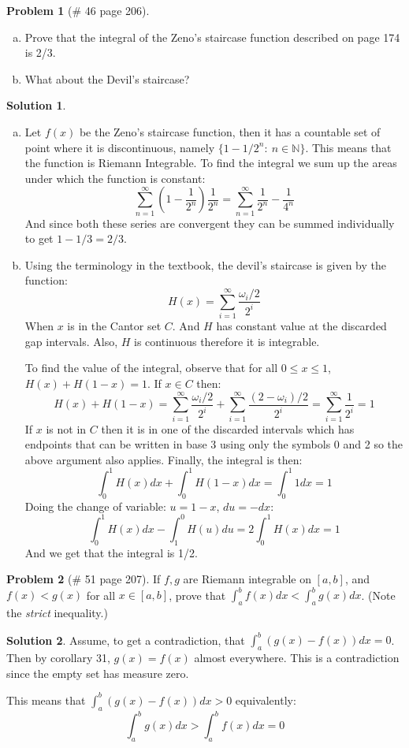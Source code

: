 \documentclass{article}
\theoremstyle{definition}
\newtheorem*{soln}{Solution}
\newtheorem*{prob}{Problem}
\theoremstyle{theorem}
\newcommand{\N}{\mathbb{N}}
\begin{document}
\begin{prob}[\# 46  page 206]
    \begin{enumerate}[(a)]
        \item Prove that the integral of the Zeno's staircase function described on page 174 is 2/3.
        \item What about the Devil's staircase?
    \end{enumerate}
\end{prob}
\begin{soln}
    \begin{enumerate}[(a)]
        \item Let $f(x)$ be the Zeno's staircase function, then it has a countable set of point where it is discontinuous, namely $\{1 - 1/2^n :\ n\in \N \}$. This means that the function is Riemann Integrable. To find the integral we sum up the areas under which the function is constant:
            $$\sum_{n=1 }^\infty \left(1-\frac 1{2^n}\right)\frac 1{2^n}= \sum_{n=1 }^\infty\frac 1{2^n} - \frac 1{4^n}$$
            And since both these series are convergent they can be summed individually to get $1- 1/3=2/3$.
        \item Using the terminology in the textbook, the devil's staircase is given by the function:
            $$H(x)=\sum_{i=1 }^\infty \frac{\omega_i/2}{2^i}$$
            When $x$ is in the Cantor set $C$. And $H$ has constant value at the discarded gap intervals. Also, $H$ is continuous therefore it is integrable. 

            To find the value of the integral, observe that for all $0\leq x \leq 1$, $H(x)+ H(1-x) =1$. If $x\in C$ then:
            $$H(x)+ H(1-x) = \sum_{i=1 }^\infty \frac{\omega_i/2}{2^i} + \sum_{i=1 }^\infty \frac{(2-\omega_i)/2}{2^i} = \sum_{i=1 }^\infty \frac{1}{2^i}= 1$$
            If $x$ is not in $C$ then it is in one of the discarded intervals which has endpoints that can be written in base 3 using only the symbols 0 and 2 so the above argument also applies. Finally, the integral is then:
            $$\int_0^1 H(x) dx + \int_0^1 H(1-x)dx = \int_0^1 1dx = 1$$
            Doing the change of variable: $u = 1-x$, $du = -dx$:
            $$\int_0^1 H(x) dx - \int_1^0 H(u)du = 2\int_0^1 H(x)dx = 1$$
And we get that the integral is 1/2.
    \end{enumerate}
\end{soln}
\vspace{1in}

\begin{prob}[\# 51  page 207]
    If $f,g$ are Riemann integrable on $[a,b]$,  and $f(x) < g(x)$ for all $x\in [a,b]$, prove that $\int_a^b f(x)dx < \int_a^bg(x)dx$. (Note the \textit{strict} inequality.)
\end{prob}
\begin{soln}
    Assume, to get a contradiction, that $\int_a^b(g(x)-f(x))dx = 0$. Then by corollary 31, $g(x) = f(x)$ almost everywhere. This is  a contradiction since the empty set has measure zero. 

    This means that $\int_a^b(g(x)-f(x))dx > 0$ equivalently:
    $$\int_a^bg(x)dx > \int_a^bf(x)dx = 0$$
\end{soln}
\vspace{1in}
\end{document}
